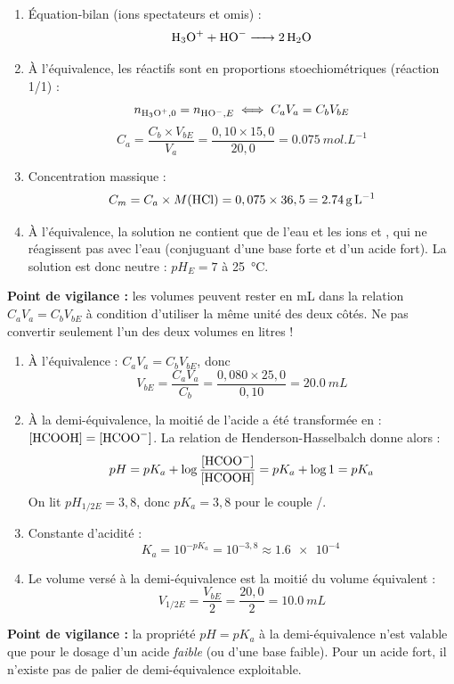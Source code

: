 \documentclass[11pt]{article}
\begin{document}
\begin{corrige}
\begin{enumerate}
\item Équation-bilan (ions spectateurs  et  omis) :
\[ \ce{H3O+ + HO- -> 2 H2O} \]
\item À l'équivalence, les réactifs sont en proportions stoechiométriques (réaction 1/1) :
\[ n_{\ce{H3O+},0} = n_{\ce{HO-},E} \iff C_a V_a = C_b V_{bE} \]
\[ C_a = \frac{C_b \times V_{bE}}{V_a} = \frac{0,10 \times 15,0}{20,0} = \SI{0,075}{mol.L^{-1}} \]
\item Concentration massique :
\[ C_m = C_a \times M(\ce{HCl}) = 0,075 \times 36,5 = \SI{2,74}{g.L^{-1}} \]
\item À l'équivalence, la solution ne contient que de l'eau et les ions  et , qui ne réagissent pas avec l'eau (conjuguant d'une base forte et d'un acide fort). La solution est donc neutre : $pH_E = 7$ à \SI{25}{\celsius}.
\end{enumerate}
\textbf{Point de vigilance :} les volumes peuvent rester en mL dans la relation $C_aV_a = C_bV_{bE}$ à condition d'utiliser la même unité des deux côtés. Ne pas convertir seulement l'un des deux volumes en litres !
\end{corrige}

\begin{corrige}
\begin{enumerate}
\item À l'équivalence : $C_a V_a = C_b V_{bE}$, donc
\[ V_{bE} = \frac{C_a V_a}{C_b} = \frac{0,080 \times 25,0}{0,10} = \SI{20,0}{mL} \]
\item À la demi-équivalence, la moitié de l'acide  a été transformée en  : $[\ce{HCOOH}] = [\ce{HCOO-}]$. La relation de Henderson-Hasselbalch donne alors :
\[ pH = pK_a + \log\frac{[\ce{HCOO-}]}{[\ce{HCOOH}]} = pK_a + \log 1 = pK_a \]
On lit $pH_{1/2E} = 3,8$, donc $\boxed{pK_a = 3,8}$ pour le couple /.
\item Constante d'acidité :
\[ K_a = 10^{-pK_a} = 10^{-3,8} \approx \SI{1,6e-4}{} \]
\item Le volume versé à la demi-équivalence est la moitié du volume équivalent :
\[ V_{1/2E} = \frac{V_{bE}}{2} = \frac{20,0}{2} = \SI{10,0}{mL} \]
\end{enumerate}
\textbf{Point de vigilance :} la propriété $pH = pK_a$ à la demi-équivalence n'est valable que pour le dosage d'un acide \emph{faible} (ou d'une base faible). Pour un acide fort, il n'existe pas de palier de demi-équivalence exploitable.
\end{corrige}
\end{document}
